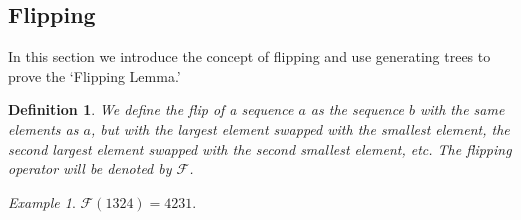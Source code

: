 \documentclass[11pt,letterpaper,twoside,english]{article}
\theoremstyle{theorem}
\newtheorem{definition}[theorem]{Definition}
\theoremstyle{remark}
\newtheorem{example}{Example}
\begin{document}
\subsection{Flipping}
In this section we introduce the concept of flipping and use generating trees to prove the `Flipping Lemma.'
\begin{definition}
We define the \emph{flip} of a sequence $a$ as the sequence $b$ with the same elements as $a$, but with the largest element swapped with the smallest element, the second largest element swapped with the second smallest element, etc.  The flipping operator will be denoted by $\mathcal{F}$.  
\end{definition}

\begin{example}
$\mathcal{F}(1324)=4231$.
\end{example}
\end{document}

